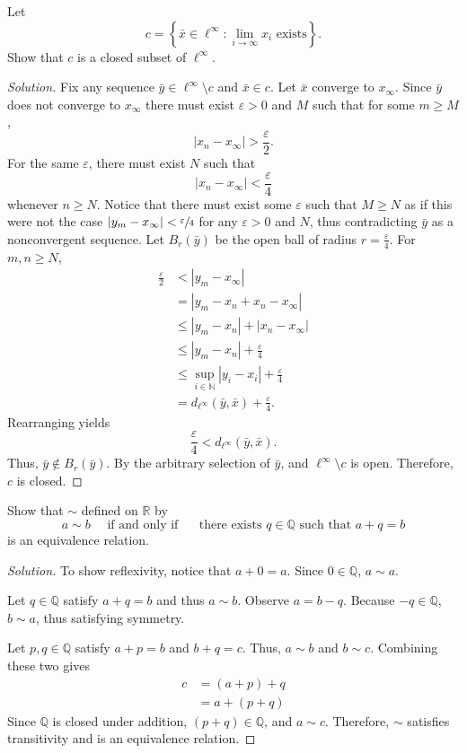 \documentclass[11pt,letterpaper]{article}
\newcommand{\N}{\mathbb{N}}
\newcommand{\Q}{\mathbb{Q}}
\newcommand{\R}{\mathbb{R}}
\newcommand{\eps}{\varepsilon}
\renewcommand{\epsilon}{\eps}
\newenvironment{prob}[1]
  {\renewcommand\theinnerprob{#1}\innerprob}
  {\endinnerprob}
\newenvironment{solution}
  {\renewcommand\qedsymbol{}\begin{proof}[Solution]}
  {\end{proof}\bigskip}
\begin{document}
\begin{prob}{6} %
Let
\[
	c = \left\{\bar x \in \ell^\infty : \lim_{i\to\infty} x_i \text{ exists}\right\}.
\]
Show that $c$ is a closed subset of $\ell^\infty$.
\end{prob}
\begin{solution}
	Fix any sequence $\bar y \in \ell^\infty \setminus c$ and $\bar x \in c$. Let $\bar x$ converge to $x_\infty$. Since $\bar y$ does not converge to $x_\infty$ there must exist $\epsilon > 0$ and $M$ such that for some $m\geq M$, $$|x_n - x_\infty| > \frac\epsilon2.$$ For the same $\epsilon$, there must exist $N$ such that $$|x_n - x_\infty| < \frac\epsilon4$$ whenever $n\geq N$. Notice that there must exist some $\epsilon$ such that $M\geq N$ as if this were not the case $|y_m - x_\infty| < \sfrac\epsilon4$ for any $\epsilon > 0$ and $N$, thus contradicting $\bar y$ as a nonconvergent sequence. Let $B_r(\bar y)$ be the open ball of radius $r = \frac\epsilon4$. For $m,n \geq N$, 
	\[\begin{split}
		\frac\epsilon2 &< |y_m - x_\infty|\\
		& = |y_m -x_n + x_n - x_\infty|\\
		&\leq |y_m -x_n| + |x_n - x_\infty|\\
		&\leq |y_m -x_n| + \frac\epsilon4\\
		&\leq \sup_{i\in \N}|y_i -x_i| + \frac\epsilon4\\
		& = d_{\ell^\infty}(\bar y, \bar x) + \frac\epsilon4.
	\end{split}\]
	Rearranging yields $$\frac\epsilon4 < d_{\ell^\infty}(\bar y, \bar x).$$ Thus, $\bar y \notin B_r(\bar y)$. By the arbitrary selection of $\bar y$, and $\ell^\infty \setminus c$ is open. Therefore, $c$ is closed.
\end{solution}
\newpage




\begin{prob}{7} %
Show that $\sim$ defined on $\R$ by
\[
	a \sim b
	\quad\text{ if and only if }
	\quad\text{ there exists 	} q \in \Q \text{ such that } a + q = b
\]
is an equivalence relation.
\end{prob}
\begin{solution}
	To show reflexivity, notice that $a + 0 = a$. Since $0\in \Q$, $a \sim a$. 
	
	Let $q\in \Q$ satisfy $a + q = b$ and thus $a \sim b$. Observe $a = b - q$. Because $-q \in \Q$, $b \sim a$, thus satisfying symmetry. 
	
	Let $p,q \in \Q$ satisfy $a + p = b$ and $b + q = c$. Thus, $a \sim b$ and $b \sim c$. Combining these two gives 
	\[\begin{split}
		c &= (a+p) + q  \\
		&= a + (p+q)
	\end{split}\]
	Since $\Q$ is closed under addition, $(p+q)\in \Q$, and $a\sim c$. Therefore, $\sim$ satisfies transitivity and is an equivalence relation. 
\end{solution}
\end{document}
